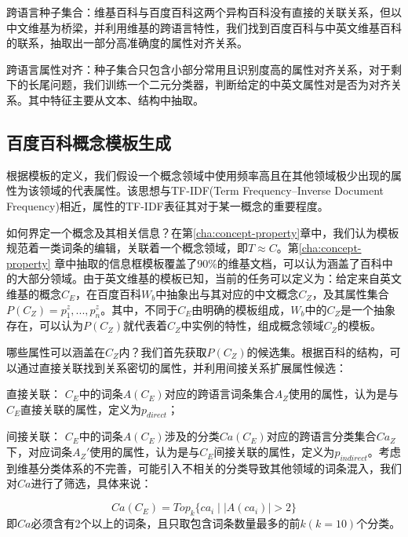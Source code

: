 {\heiti 跨语言种子集合：}维基百科与百度百科这两个异构百科没有直接的关联关系，但以中文维基为桥梁，并利用维基的跨语言特性，我们找到百度百科与中英文维基百科的联系，抽取出一部分高准确度的属性对齐关系。

{\heiti 跨语言属性对齐：}种子集合只包含小部分常用且识别度高的属性对齐关系，对于剩下的长尾问题，我们训练一个二元分类器，判断给定的中英文属性对是否为对齐关系。其中特征主要从文本、结构中抽取。

\subsection{百度百科概念模板生成}
\label{sec:domain-template}
根据模板的定义，我们假设一个概念领域中使用频率高且在其他领域极少出现的属性为该领域的代表属性。该思想与TF-IDF(Term Frequency–Inverse Document Frequency)相近，属性的TF-IDF表征其对于某一概念的重要程度。

如何界定一个概念及其相关信息？在第\ref{cha:concept-property}章中，我们认为模板规范着一类词条的编辑，关联着一个概念领域，即$T \approx C$。第\ref{cha:concept-property} 章中抽取的信息框模板覆盖了90\%的维基文档，可以认为涵盖了百科中的大部分领域。由于英文维基的模板已知，当前的任务可以定义为：给定来自英文维基的概念$C_E$，在百度百科$W_b$中抽象出与其对应的中文概念$C_Z$，及其属性集合$P(C_Z)={p_1^z,...,p_n^z}$。其中，不同于$C_E$由明确的模板组成，$W_b$中的$C_Z$是一个抽象存在，可以认为$P(C_Z)$就代表着$C_Z$中实例的特性，组成概念领域$C_Z$的模板。

哪些属性可以涵盖在$C_Z$内？我们首先获取$P(C_Z)$的候选集。根据百科的结构，可以通过直接关联找到关系密切的属性，并利用间接关系扩展属性候选：

{\heiti 直接关联：} $C_E$中的词条$A(C_E)$对应的跨语言词条集合$A_Z$使用的属性，认为是与$C_E$直接关联的属性，定义为$p_{direct}$；

{\heiti 间接关联：} $C_E$中的词条$A(C_E)$涉及的分类$Ca(C_E)$对应的跨语言分类集合$Ca_Z$下，对应词条$A_Z'$使用的属性，认为是与$C_E$间接关联的属性，定义为$p_{indirect}$。考虑到维基分类体系的不完善，可能引入不相关的分类导致其他领域的词条混入，我们对$Ca$进行了筛选，具体来说：

\begin{equation}
Ca(C_E) = Top_k\{ ca_i\mid |A(ca_i)| > 2 \}
\end{equation}
即$Ca$必须含有2个以上的词条，且只取包含词条数量最多的前$k(k=10)$个分类。

